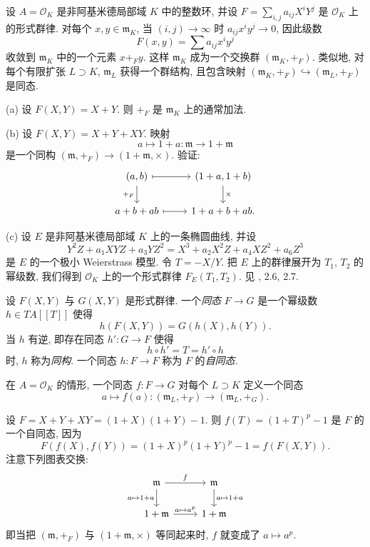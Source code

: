 设 $A=\mathcal{O}_K$ 是非阿基米德局部域 $K$ 中的整数环, 并设 $F=\sum_{i,j}a_{ij}X^iY^j$ 是 $\mathcal{O}_K$ 上的形式群律. 对每个 $x,y\in\mathfrak{m}_K$, 当 $(i,j)\to\infty$ 时 $a_{ij}x^i y^j\to 0$, 因此级数
\[
F(x,y)=\sum a_{ij}x^i y^j
\]
收敛到 $\mathfrak{m}_K$ 中的一个元素 $x+_F y$. 这样 $\mathfrak{m}_K$ 成为一个交换群 $(\mathfrak{m}_K,+_F)$. 类似地, 对每个有限扩张 $L\supset K$, $\mathfrak{m}_L$ 获得一个群结构, 且包含映射 $(\mathfrak{m}_K,+_F)\hookrightarrow(\mathfrak{m}_L,+_F)$ 是同态.

\begin{example}\label{ex:2.5}
(a) 设 $F(X,Y)=X+Y$. 则 $+_F$ 是 $\mathfrak{m}_K$ 上的通常加法.

(b) 设 $F(X,Y)=X+Y+XY$. 映射
\[
a\mapsto 1+a\colon\mathfrak{m}\to 1+\mathfrak{m}
\]
是一个同构 $(\mathfrak{m},+_F)\to(1+\mathfrak{m},\times)$. 验证:
\[
\begin{tikzcd}
(a,b)\ar[r,mapsto]\ar[d,"+_F"'] & (1+a,1+b)\ar[d,"\times"]\\
a+b+ab\ar[r,mapsto] & 1+a+b+ab.
\end{tikzcd}
\]

(c) 设 $E$ 是非阿基米德局部域 $K$ 上的一条椭圆曲线, 并设
\[
Y^2Z+a_1XYZ+a_3YZ^2=X^3+a_2X^2Z+a_4XZ^2+a_6Z^3
\]
是 $E$ 的一个极小 Weierstrass 模型. 令 $T=-X/Y$. 把 $E$ 上的群律展开为 $T_1$, $T_2$ 的幂级数, 我们得到 $\mathcal{O}_K$ 上的一个形式群律 $F_E(T_1,T_2)$. 见 \cite{Milne2020}, 2.6, 2.7.
\end{example}

\begin{definition}\label{def:2.6}
设 $F(X,Y)$ 与 $G(X,Y)$ 是形式群律. 一个\emph{同态} $F\to G$ 是一个幂级数 $h\in TA[[T]]$ 使得
\[
h(F(X,Y))=G(h(X),h(Y)).
\]
当 $h$ 有逆, 即存在同态 $h'\colon G\to F$ 使得
\[
h\circ h'=T=h'\circ h
\]
时, $h$ 称为\emph{同构}. 一个同态 $h\colon F\to F$ 称为 $F$ 的\emph{自同态}.
\end{definition}

在 $A=\mathcal{O}_K$ 的情形, 一个同态 $f\colon F\to G$ 对每个 $L\supset K$ 定义一个同态
\[
a\mapsto f(a)\colon(\mathfrak{m}_L,+_F)\to(\mathfrak{m}_L,+_G).
\]

\begin{example}\label{ex:2.7}
设 $F=X+Y+XY=(1+X)(1+Y)-1$. 则 $f(T)=(1+T)^p-1$ 是 $F$ 的一个自同态, 因为
\[
F(f(X),f(Y))=(1+X)^p(1+Y)^p-1=f(F(X,Y)).
\]
注意下列图表交换:
\[
\begin{tikzcd}
\mathfrak{m}\ar[r,"f"]\ar[d,"a\mapsto 1+a"'] & \mathfrak{m}\ar[d,"a\mapsto 1+a"]\\
1+\mathfrak{m}\ar[r,"a\mapsto a^p"] & 1+\mathfrak{m}
\end{tikzcd}
\]
即当把 $(\mathfrak{m},+_F)$ 与 $(1+\mathfrak{m},\times)$ 等同起来时, $f$ 就变成了 $a\mapsto a^p$.
\end{example}

